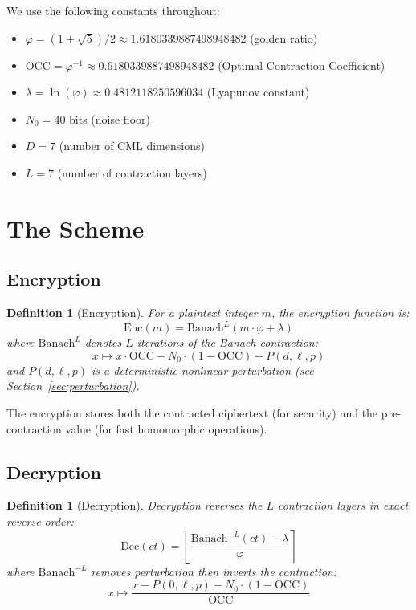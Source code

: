 \documentclass[11pt,a4paper]{article}
\newtheorem{definition}[theorem]{Definition}
\begin{document}
We use the following constants throughout:
\begin{itemize}
    \item $\varphi = (1+\sqrt{5})/2 \approx 1.6180339887498948482$ (golden ratio)
    \item $\text{OCC} = \varphi^{-1} \approx 0.6180339887498948482$ (Optimal Contraction Coefficient)
    \item $\lambda = \ln(\varphi) \approx 0.4812118250596034$ (Lyapunov constant)
    \item $N_0 = 40$ bits (noise floor)
    \item $D = 7$ (number of CML dimensions)
    \item $L = 7$ (number of contraction layers)
\end{itemize}

\section{The Scheme}
\label{sec:scheme}

\subsection{Encryption}

\begin{definition}[Encryption]
For a plaintext integer $m$, the encryption function is:
\begin{equation}
    \text{Enc}(m) = \text{Banach}^L(m \cdot \varphi + \lambda)
\end{equation}
where $\text{Banach}^L$ denotes $L$ iterations of the Banach contraction:
\begin{equation}
    x \mapsto x \cdot \text{OCC} + N_0 \cdot (1 - \text{OCC}) + P(d, \ell, p)
\end{equation}
and $P(d, \ell, p)$ is a deterministic nonlinear perturbation (see Section~\ref{sec:perturbation}).
\end{definition}

The encryption stores both the contracted ciphertext (for security) and the pre-contraction value (for fast homomorphic operations).

\subsection{Decryption}

\begin{definition}[Decryption]
Decryption reverses the $L$ contraction layers in exact reverse order:
\begin{equation}
    \text{Dec}(ct) = \left\lfloor \frac{\text{Banach}^{-L}(ct) - \lambda}{\varphi} \right\rceil
\end{equation}
where $\text{Banach}^{-L}$ removes perturbation then inverts the contraction:
\begin{equation}
    x \mapsto \frac{x - P(0, \ell, p) - N_0 \cdot (1 - \text{OCC})}{\text{OCC}}
\end{equation}
\end{definition}
\end{document}
